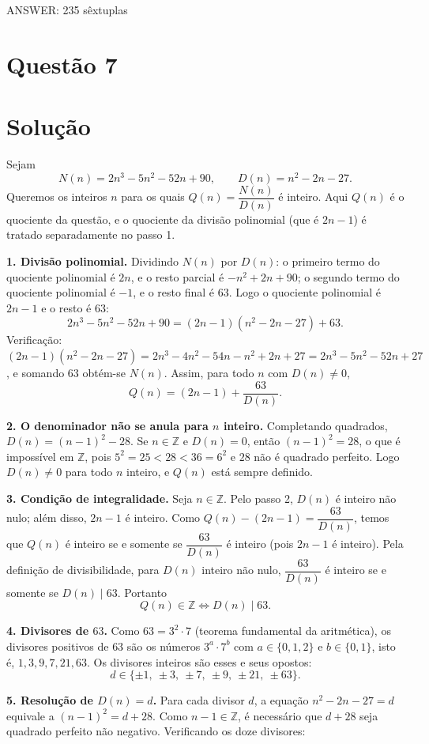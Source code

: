 \documentclass{article}%
\begin{document}
ANSWER: 235 sêxtuplas%
\newpage%
\section*{Questão 7}

\section*{Solução}

Sejam
\[
N(n)=2n^3-5n^2-52n+90, \qquad D(n)=n^2-2n-27 .
\]
Queremos os inteiros $n$ para os quais $Q(n)=\dfrac{N(n)}{D(n)}$ é inteiro. Aqui $Q(n)$ é o quociente da questão, e o quociente da divisão polinomial (que é $2n-1$) é tratado separadamente no passo 1.

\textbf{1. Divisão polinomial.} Dividindo $N(n)$ por $D(n)$: o primeiro termo do quociente polinomial é $2n$, e o resto parcial é $-n^2+2n+90$; o segundo termo do quociente polinomial é $-1$, e o resto final é $63$. Logo o quociente polinomial é $2n-1$ e o resto é $63$:
\[
2n^3-5n^2-52n+90=(2n-1)(n^2-2n-27)+63 .
\]
Verificação: $(2n-1)(n^2-2n-27)=2n^3-4n^2-54n-n^2+2n+27=2n^3-5n^2-52n+27$, e somando $63$ obtém-se $N(n)$. Assim, para todo $n$ com $D(n)\neq 0$,
\[
Q(n)=(2n-1)+\frac{63}{D(n)} .
\]

\textbf{2. O denominador não se anula para $n$ inteiro.} Completando quadrados, $D(n)=(n-1)^2-28$. Se $n\in\mathbb{Z}$ e $D(n)=0$, então $(n-1)^2=28$, o que é impossível em $\mathbb{Z}$, pois $5^2=25<28<36=6^2$ e $28$ não é quadrado perfeito. Logo $D(n)\neq 0$ para todo $n$ inteiro, e $Q(n)$ está sempre definido.

\textbf{3. Condição de integralidade.} Seja $n\in\mathbb{Z}$. Pelo passo 2, $D(n)$ é inteiro não nulo; além disso, $2n-1$ é inteiro. Como $Q(n)-(2n-1)=\dfrac{63}{D(n)}$, temos que $Q(n)$ é inteiro se e somente se $\dfrac{63}{D(n)}$ é inteiro (pois $2n-1$ é inteiro). Pela definição de divisibilidade, para $D(n)$ inteiro não nulo, $\dfrac{63}{D(n)}$ é inteiro se e somente se $D(n)\mid 63$. Portanto
\[
Q(n)\in\mathbb{Z}\iff D(n)\mid 63 .
\]

\textbf{4. Divisores de $63$.} Como $63=3^2\cdot 7$ (teorema fundamental da aritmética), os divisores positivos de $63$ são os números $3^a\cdot 7^b$ com $a\in\{0,1,2\}$ e $b\in\{0,1\}$, isto é, $1,3,9,7,21,63$. Os divisores inteiros são esses e seus opostos:
\[
d\in\{\pm 1,\ \pm 3,\ \pm 7,\ \pm 9,\ \pm 21,\ \pm 63\}.
\]

\textbf{5. Resolução de $D(n)=d$.} Para cada divisor $d$, a equação $n^2-2n-27=d$ equivale a $(n-1)^2=d+28$. Como $n-1\in\mathbb{Z}$, é necessário que $d+28$ seja quadrado perfeito não negativo. Verificando os doze divisores:
\end{document}
